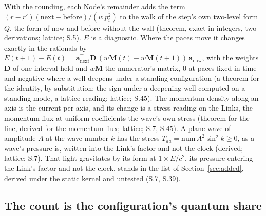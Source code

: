 \documentclass[pdflatex,sn-mathphys-num]{sn-jnl}
\newcommand{\num}{\mathrm{num}}
\newcommand{\bM}{\mathbf M}
\newcommand{\bD}{\mathbf D}
\theoremstyle{thmstyleone}
\theoremstyle{thmstyletwo}
\begin{document}
With the rounding, each Node's remainder adds the term $(r - r')(\mathrm{next} - \mathrm{before}) / (w\,p_i^2)$ to the walk of the step's own two-level form $Q$, the form of now and before without the wall (theorem, exact in integers, two derivations; lattice; S.5). $E$ is a diagnostic. Where the paces move it changes exactly in the rationals by $E(t + 1) - E(t) = \mathbf a_{\mathrm{next}}^{\top}\bD\,(w\bM(t) - w\bM(t + 1))\,\mathbf a_{\mathrm{now}}$, with the weights $\bD$ of one interval held and $w\bM$ the numerator's matrix, $0$ at paces fixed in time and negative where a well deepens under a standing configuration (a theorem for the identity, by substitution; the sign under a deepening well computed on a standing mode, a lattice reading; lattice; S.45). The momentum density along an axis is the current per axis, and its change is a stress reading on the Links, the momentum flux at uniform coefficients the wave's own stress (theorem for the line, derived for the momentum flux; lattice; S.7, S.45). A plane wave of amplitude $A$ at the wave number $k$ has the stress $T_{aa} = \num\,A^2\sin^2 k \ge 0$, as a wave's pressure is, written into the Link's factor and not the clock (derived; lattice; S.7). That light gravitates by its form at $1 \times E / c^2$, its pressure entering the Link's factor and not the clock, stands in the list of Section~\ref{sec:added}, derived under the static kernel and untested (S.7, S.39).

\subsection{The count is the configuration's quantum share}\label{sec:share}
\end{document}
